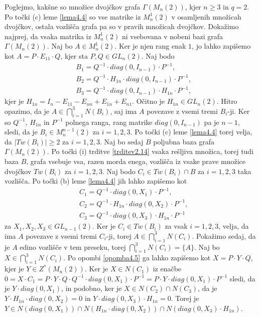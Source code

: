 \documentclass[mat1, tisk]{fmfdelo}
\begin{document}
\begin{dokaz}
  Poglejmo, kakšne so množice dvojčkov grafa $\Gamma(M_n(2))$, kjer $n \geq 3$ in $q = 2$. 
  Po točki (c) leme \ref{lema4.4} so vse matrike iz ${M}_n^1(2)$ v osamljenih množicah 
  dvojčkov, ostala vozlišča grafa pa so v pravih množicah dvojčkov. Dokažimo najprej, 
  da vsaka matrika iz ${M}_n^1(2)$ ni vsebovana v nobeni bazi grafa $\Gamma(M_n(2))$. Naj bo 
  $A \in {M}_n^1(2)$. Ker je njen rang enak $1$, jo lahko zapišemo kot $A = P \cdot E_{11} \cdot Q$, 
  kjer sta $P, Q \in GL_n(2)$. Naj bodo
  \begin{align*}
    &B_1 = Q^{-1} \cdot diag(0, I_{n-1}) \cdot P^{-1}, \\
    &B_2 = Q^{-1} \cdot H_{1n} \cdot diag(0, I_{n-1}) \cdot P^{-1},\\
    &B_3 = Q^{-1} \cdot diag(0, I_{n-1}) \cdot H_{1n} \cdot P^{-1},
  \end{align*} 
  kjer je 
  $H_{1n} = I_n - E_{11} - E_{nn} + E_{1n} + E_{n1}$. Očitno je $H_{1n} \in GL_n(2)$. 
  Hitro opazimo, da je $A \in \bigcap\limits_{i=1}^{3} N(B_i)$, saj ima $A$ povezave z 
  vsemi tremi $B_i$-ji. Ker so $Q^{-1}$, $H_{1n}$ in $P^{-1}$ polnega ranga, rang matrike 
  $diag(0, I_{n-1})$ pa je $n-1$, sledi, da je $B_i \in {M}_n^{n-1}(2)$ za $i = 1, 2, 3$. Po 
  točki (c) leme \ref{lema4.4} torej velja, da $|Tw(B_i)| \geq 2$ za $i = 1, 2, 3$. Naj bo 
  sedaj $B$ poljubna baza grafa $\Gamma(M_n(2))$. Po točki (i) trditve \ref{trditev2.14} 
  vsaka rešljiva množica, torej tudi baza $B$, grafa vsebuje vsa, razen morda enega, vozlišča iz 
  vsake prave množice dvojčkov $Tw(B_i)$ za $i = 1, 2, 3$. Naj bodo $C_i \in Tw(B_i) \cap B$ za 
  $i = 1, 2, 3$ taka vozlišča. Po točki (b) leme \ref{lema4.4} jih lahko zapišemo kot 
  \begin{align*}
    &C_1 = Q^{-1} \cdot diag(0, X_1) \cdot P^{-1}, \\
    &C_2 = Q^{-1} \cdot H_{1n} \cdot diag(0, X_2) \cdot P^{-1},\\
    &C_3 = Q^{-1} \cdot diag(0, X_3) \cdot H_{1n} \cdot P^{-1} 
  \end{align*}
  za $X_1, X_2, X_3 \in GL_{n-1}(2)$. 
  Ker je $C_i \in Tw(B_i)$ za vsak $i = 1, 2, 3$, velja, da ima $A$ povezave z vsemi tremi $C_i$-ji, 
  torej $A \in \bigcap\limits_{i=1}^{3} N(C_i)$. Pokažimo sedaj, da je $A$ edino vozlišče v tem 
  preseku, torej $\bigcap\limits_{i=1}^{3} N(C_i) = \{A\}$. Naj bo $X \in \bigcap\limits_{i=1}^{3} N(C_i)$. 
  Po opombi \ref{opomba4.5} ga lahko zapišemo kot $X = P \cdot Y \cdot Q$, kjer je $Y \in Z^*(M_n(2))$. 
  Ker je $X \in N(C_1)$ iz enačbe 
  $0 = X \cdot C_1 = P \cdot Y \cdot Q \cdot Q^{-1} \cdot diag(0, X_1) \cdot P^{-1} = P \cdot Y \cdot diag(0, X_1) \cdot P^{-1}$ 
  sledi, da je $Y \cdot diag(0, X_1)$, in podobno, ker je $X \in N(C_2) \cap N(C_3)$, da je 
  $Y \cdot H_{1n} \cdot diag(0, X_2) = 0$ in $Y \cdot diag(0, X_3) \cdot H_{1n} = 0$. Torej 
  je $Y \in N(diag(0, X_1)) \cap N(H_{1n} \cdot diag(0, X_2)) \cap N(diag(0, X_3) \cdot H_{1n})$. 
\end{dokaz}
\end{document}
